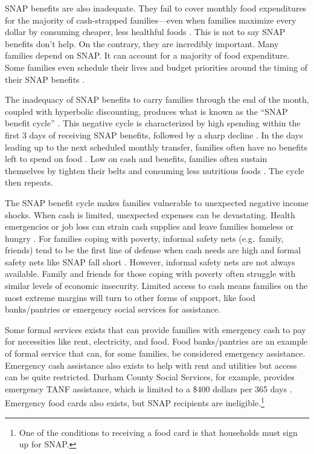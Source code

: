 \documentclass[12pt,letterpaperpaper,]{book}
\begin{document}
SNAP benefits are also inadequate. They fail to cover monthly food
expenditures for the majority of cash-strapped families---even when
families maximize every dollar by consuming cheaper, less healthful
foods \citep{wiig_art_2009}. This is not to say SNAP benefits don't
help. On the contrary, they are incredibly important. Many families
depend on SNAP. It can account for a majority of food expenditure. Some
families even schedule their lives and budget priorities around the
timing of their SNAP benefits \citep{edin_snap_2013}.

The inadequacy of SNAP benefits to carry families through the end of the
month, coupled with hyperbolic discounting, produces what is known as
the ``SNAP benefit cycle'' \citep{smith_effects_2016}. This negative
cycle is characterized by high spending within the first 3 days of
receiving SNAP benefits, followed by a sharp decline
\citep{goldin_is_2016}. In the days leading up to the next scheduled
monthly transfer, families often have no benefits left to spend on food
\citep{wilde_monthly_2000, shapiro_is_2005}. Low on cash and benefits,
families often sustain themselves by tighten their belts and consuming
less nutritious foods \citep{todd_revisiting_2015}. The cycle then
repeats.

The SNAP benefit cycle makes families vulnerable to unexpected negative
income shocks. When cash is limited, unexpected expenses can be
devastating. Health emergencies or job loss can strain cash supplies and
leave families homeless or hungry \citep{curtis_life_2013}. For families
coping with poverty, informal safety nets (e.g.~family, friends) tend to
be the first line of defense when cash needs are high and formal safety
nets like SNAP fall short \citep{schenck-fontaine_use_2016}. However,
informal safety nets are not always available. Family and friends for
those coping with poverty often struggle with similar levels of economic
insecurity. Limited access to cash means families on the most extreme
margins will turn to other forms of support, like food banks/pantries or
emergency social services for assistance.

Some formal services exists that can provide families with emergency
cash to pay for necessities like rent, electricity, and food. Food
banks/pantries are an example of formal service that can, for some
families, be considered emergency assistance. Emergency cash assistance
also exists to help with rent and utilities but access can be quite
restricted. Durham County Social Services, for example, provides
emergency TANF assistance, which is limited to a \$400 dollars per 365
days \citep{durham_county_department_of_social_services_directory_2016}.
Emergency food cards also exists, but SNAP recipients are
ineligible.\footnote{One of the conditions to receiving a food card is
  that households must sign up for SNAP.}
\end{document}
